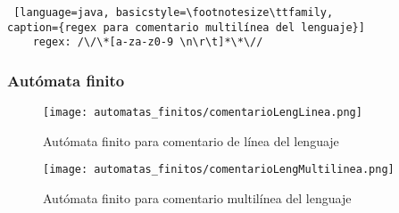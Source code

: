 \begin{lstlisting} [language=java, basicstyle=\footnotesize\ttfamily,
caption={regex para comentario multilínea del lenguaje}]
	regex: /\/\*[a-za-z0-9 \n\r\t]*\*\//
\end{lstlisting}

\subsubsection{Autómata finito}

\begin{figure}[H]
	\centering
	\texttt{[image: automatas\_finitos/comentarioLengLinea.png]}
	\caption{Autómata finito para comentario de línea del lenguaje}
	\label{fig:af_com_linea_leng}
\end{figure}

\begin{figure}[H]
	\centering
	\texttt{[image: automatas\_finitos/comentarioLengMultilinea.png]}
	\caption{Autómata finito para comentario multilínea del lenguaje}
	\label{fig:af_com_multi_leng}
\end{figure}
